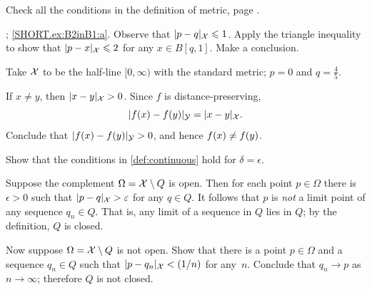 
\setcounter{eqtn}{0}

Check all the conditions in the definition of metric, page \pageref{page:def:metric}.

\parbf{\ref{ex:B2inB1}}; \ref{SHORT.ex:B2inB1:a}.
Observe that $\dist{p}{q}{\spc{X}}\le 1$.
Apply the triangle inequality to show that $\dist{p}{x}{\spc{X}}\le 2$ for any $x\in B[q,1]$.
Make a conclusion.

Take $\mathcal{X}$ to be the half-line $[0,\infty)$ with the standard metric; $p=0$ and $q=\tfrac45$.

If $x\ne y$, then $\dist{x}{y}{\spc{X}}>0$.
Since $f$ is distance-preserving,
$$\dist{f(x)}{f(y)}{\spc{Y}}=\dist{x}{y}{\spc{X}}.$$
Conclude that $\dist{f(x)}{f(y)}{\spc{Y}}>0$, and hence $f(x)\z\ne f(y)$.

Show that the conditions in \ref{def:continuous} hold for $\delta=\epsilon$.

Suppose the complement $\Omega=\mathcal{X}\setminus Q$ is open.
Then for each point $p\in \Omega$ there is $\epsilon>0$ such that $\dist{p}{q}{\spc{X}}>\epsilon$ for any $q\in Q$.
It follows that $p$ is \textit{not} a limit point of any sequence $q_n\in Q$.
That is, any limit of a sequence in $Q$ lies in $Q$;
by the definition, $Q$ is closed.

Now suppose $\Omega=\mathcal{X}\setminus Q$ is not open.
Show that there is a point $p\in \Omega$ and a sequence $q_n\in Q$ such that $\dist{p}{q_n}{\spc{X}}\z<\tfrac 1n$ for any~$n$.
Conclude that $q_n\to p$ as $n\to \infty$;
therefore $Q$ is not closed.

\spell{\end{multicols}}{}
